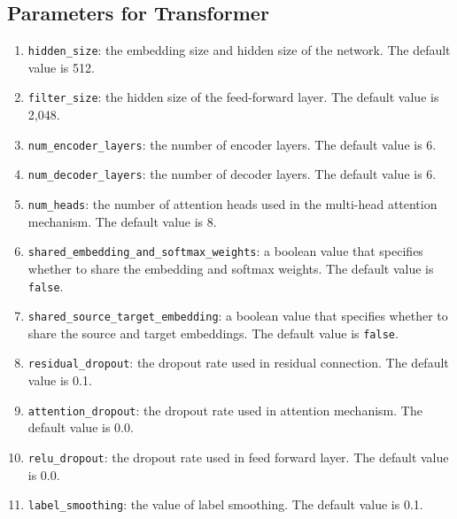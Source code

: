\documentclass{article}
\begin{document}
\subsection{Parameters for Transformer}
\begin{enumerate}
\item \verb|hidden_size|: the embedding size and hidden size of the network. The default value is 512.
\item \verb|filter_size|: the hidden size of the feed-forward layer. The default value is 2,048.
\item \verb|num_encoder_layers|: the number of encoder layers. The default value is 6.
\item \verb|num_decoder_layers|: the number of decoder layers. The default value is 6.
\item \verb|num_heads|: the number of attention heads used in the multi-head attention mechanism. The default value is 8.
\item \verb|shared_embedding_and_softmax_weights|: a boolean value that specifies whether to share the embedding and softmax weights. The default value is \verb|false|.
\item \verb|shared_source_target_embedding|: a boolean value that specifies whether to share the source and target embeddings. The default value is \verb|false|.
\item \verb|residual_dropout|: the dropout rate used in residual connection. The default value is 0.1.
\item \verb|attention_dropout|: the dropout rate used in attention mechanism. The default value is 0.0.
\item\verb|relu_dropout|: the dropout rate used in feed forward layer. The default value is 0.0.
\item \verb|label_smoothing|: the value of label smoothing. The default value is 0.1.
\end{enumerate}



\end{document}
